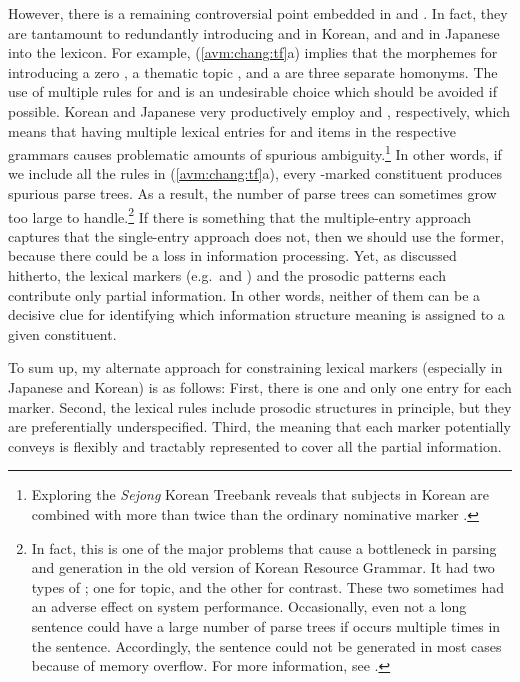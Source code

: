 However, there is a remaining controversial point embedded in
 and .  In fact,
they are tantamount to redundantly introducing \ika and \nun in
Korean, and \ga and \wa in Japanese into the lexicon. For example,
(\ref{avm:chang:tf}a) implies that the morphemes for introducing a
zero  \nun, a thematic topic \nun, and a  \nun are three separate homonyms.  The use of multiple rules
for \nun and \wa is an undesirable choice which should be avoided if
possible.  Korean and Japanese very productively employ \nun and \wa,
respectively, which means that having multiple lexical entries for \wa
and \nun items in the respective grammars causes problematic amounts
of spurious ambiguity.\footnote{Exploring the \textit{Sejong} Korean
  Treebank reveals that subjects in Korean are combined with \nun more
  than twice than the ordinary nominative marker \ika.} In other
words, if we include all the rules in (\ref{avm:chang:tf}a), every
\onun-marked constituent produces spurious parse trees.  As a result,
the number of parse trees can sometimes grow too large to
handle.\footnote{In fact, this is one of the major problems that cause
  a bottleneck in parsing and generation in the old version of Korean
  Resource Grammar.  It had two types of \nun; one for topic, and the
  other for contrast. These two \nun sometimes had an
  adverse effect on system performance.  Occasionally, even not a long
  sentence could have a large number of parse trees if \nun occurs
  multiple times in the sentence. Accordingly, the sentence could not
  be generated in most cases because of memory overflow. For more
  information, see \citet{song:etal:10}.}  If there is something that
the multiple-entry approach captures that the single-entry approach
does not, then we should use the former, because there could be a loss
in information processing. Yet, as discussed hitherto, the lexical
markers (e.g.\ \nun and \wa) and the prosodic patterns each contribute
only partial information. In other words, neither of them can be a
decisive clue for identifying which information structure meaning is
assigned to a given constituent.



To sum up, my alternate approach for constraining lexical markers
(especially in Japanese and Korean) is as follows:
First, there is one and only one entry for each marker. Second, the
lexical rules include prosodic structures in principle, but they are
preferentially underspecified. Third, the meaning that each marker
potentially conveys is flexibly and tractably represented to cover all
the partial information.



